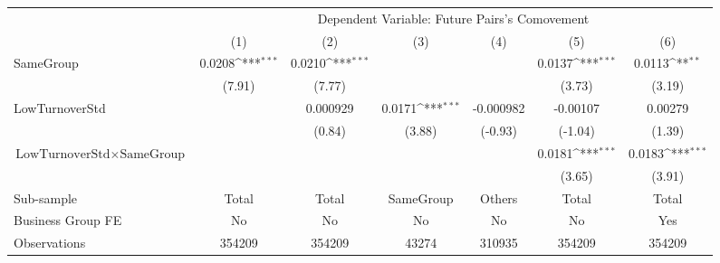 {
\def\sym#1{\ifmmode^{#1}\else\(^{#1}\)\fi}
\begin{tabular}{l*{6}{c}}
\hline\hline
                &\multicolumn{6}{c}{Dependent Variable:  Future Pairs's Comovement}                                               \\\cmidrule(lr){2-7}
                &\multicolumn{1}{c}{(1)}         &\multicolumn{1}{c}{(2)}         &\multicolumn{1}{c}{(3)}         &\multicolumn{1}{c}{(4)}         &\multicolumn{1}{c}{(5)}         &\multicolumn{1}{c}{(6)}         \\
\hline
SameGroup       &   0.0208\sym{***}&   0.0210\sym{***}&                  &                  &   0.0137\sym{***}&   0.0113\sym{**} \\
                &   (7.91)         &   (7.77)         &                  &                  &   (3.73)         &   (3.19)         \\
[1em]
LowTurnoverStd  &                  & 0.000929         &   0.0171\sym{***}&-0.000982         & -0.00107         &  0.00279         \\
                &                  &   (0.84)         &   (3.88)         &  (-0.93)         &  (-1.04)         &   (1.39)         \\
[1em]
$ {\text{LowTurnoverStd} } \times {\text{SameGroup} }  $ &                  &                  &                  &                  &   0.0181\sym{***}&   0.0183\sym{***}\\
                &                  &                  &                  &                  &   (3.65)         &   (3.91)         \\
\hline
Sub-sample      &    Total         &    Total         &SameGroup         &   Others         &    Total         &    Total         \\
Business Group FE&       No         &       No         &       No         &       No         &       No         &      Yes         \\
Observations    &   354209         &   354209         &    43274         &   310935         &   354209         &   354209         \\
\hline\hline  \end{tabular}}
